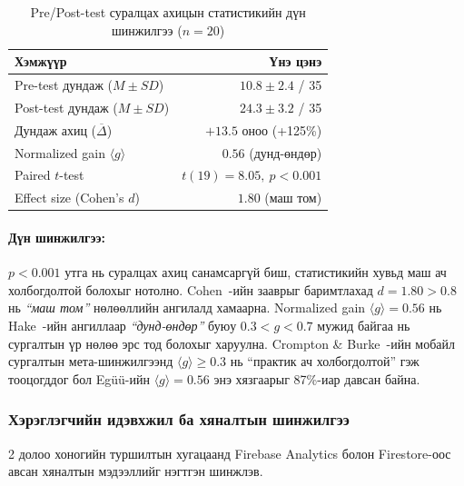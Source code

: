 \begin{table}[H]
\centering
\caption{Pre/Post-test суралцах ахицын статистикийн дүн шинжилгээ ($n=20$)}
\label{tab:prepost-stats}
\begin{tabular}{|l|r|}
\hline
\textbf{Хэмжүүр} & \textbf{Үнэ цэнэ} \\
\hline
Pre-test дундаж ($M \pm SD$) & $10.8 \pm 2.4$ / 35 \\
\hline
Post-test дундаж ($M \pm SD$) & $24.3 \pm 3.2$ / 35 \\
\hline
Дундаж ахиц ($\overline{\Delta}$) & $+13.5$ оноо (+125\%) \\
\hline
Normalized gain $\langle g \rangle$ & $0.56$ (дунд-өндөр) \\
\hline
Paired $t$-test & $t(19) = 8.05,\ p < 0.001$ \\
\hline
Effect size (Cohen's $d$) & $1.80$ (маш том) \\
\hline
\end{tabular}
\end{table}

\paragraph{Дүн шинжилгээ:}
$p < 0.001$ утга нь суралцах ахиц санамсаргүй биш, статистикийн хувьд маш ач холбогдолтой болохыг нотолно. Cohen~\cite{cohen1988statistical}-ийн зааврыг баримтлахад $d = 1.80 > 0.8$ нь \textit{``маш том''} нөлөөллийн ангилалд хамаарна. Normalized gain $\langle g \rangle = 0.56$ нь Hake~\cite{hake1998interactive}-ийн ангиллаар \textit{``дунд-өндөр''} буюу $0.3 < g < 0.7$ мужид байгаа нь сургалтын үр нөлөө эрс тод болохыг харуулна. Crompton \& Burke~\cite{crompton2021mobile}-ийн мобайл сургалтын мета-шинжилгээнд $\langle g \rangle \geq 0.3$ нь ``практик ач холбогдолтой'' гэж тооцогддог бол Egüü-ийн $\langle g \rangle = 0.56$ энэ хязгаарыг 87\%-иар давсан байна.

\subsubsection{Хэрэглэгчийн идэвхжил ба хяналтын шинжилгээ}
\label{subsubsec:engagement}

2 долоо хоногийн туршилтын хугацаанд Firebase Analytics болон Firestore-оос авсан хяналтын мэдээллийг нэгтгэн шинжлэв.

